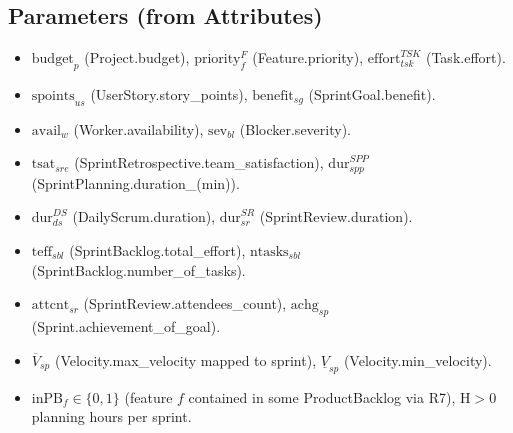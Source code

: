 \documentclass[11pt,a4paper]{article}
\begin{document}
\subsection*{Parameters (from Attributes)}
\begin{itemize}
  \item $\text{budget}_p$ (Project.budget), $\text{priority}^F_f$ (Feature.priority), $\text{effort}^{TSK}_{tsk}$ (Task.effort).
  \item $\text{spoints}_{us}$ (UserStory.story\_points), $\text{benefit}_{sg}$ (SprintGoal.benefit).
  \item $\text{avail}_w$ (Worker.availability), $\text{sev}_{bl}$ (Blocker.severity).
  \item $\text{tsat}_{sre}$ (SprintRetrospective.team\_satisfaction), $\text{dur}^{SPP}_{spp}$ (SprintPlanning.duration\_(min)).
  \item $\text{dur}^{DS}_{ds}$ (DailyScrum.duration), $\text{dur}^{SR}_{sr}$ (SprintReview.duration).
  \item $\text{teff}_{sbl}$ (SprintBacklog.total\_effort), $\text{ntasks}_{sbl}$ (SprintBacklog.number\_of\_tasks).
  \item $\text{attcnt}_{sr}$ (SprintReview.attendees\_count), $\text{achg}_{sp}$ (Sprint.achievement\_of\_goal).
  \item $\overline{V}_{sp}$ (Velocity.max\_velocity mapped to sprint), $\underline{V}_{sp}$ (Velocity.min\_velocity).
  \item $\text{inPB}_f\in\{0,1\}$ (feature $f$ contained in some ProductBacklog via R7), $\text{H}\!>\!0$ planning hours per sprint.
\end{itemize}
\end{document}
